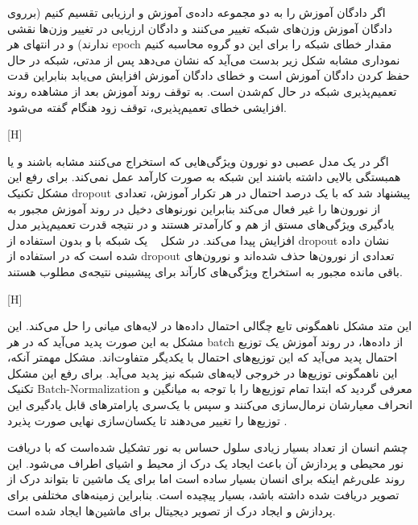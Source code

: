 اگر دادگان آموزش را به دو مجموعه داده‌ی آموزش و ارزیابی تقسیم کنیم (برروی دادگان آموزش وزن‌های شبکه تغییر می‌کنند و دادگان ارزیابی در تغییر وزن‌ها نقشی ندارند) و در انتهای هر epoch مقدار خطای شبکه را برای این دو گروه محاسبه کنیم نموداری مشابه شکل زیر بدست می‌آید که نشان می‌دهد پس از مدتی، شبکه در حال حفظ کردن دادگان آموزش است و خطای دادگان آموزش افزایش می‌یابد بنابراین قدت تعمیم‌پذیری شبکه در حال کم‌شدن است. به توقف روند آموزش بعد از مشاهده روند افزایشی خطای تعمیم‌پذیری، توقف زود هنگام گفته می‌شود.

[H]

اگر در یک مدل عصبی دو نورون ویژگی‌هایی که استخراج می‌کنند مشابه باشند و یا همبستگی بالایی داشته باشند این شبکه به صورت کارآمد عمل نمی‌کند. برای رفع این مشکل تکنیک dropout پیشنهاد شد که با یک درصد احتمال در هر تکرار آموزش، تعدادی از نورون‌ها را غیر فعال می‌کند بنابراین نورنو‌های دخیل در روند آموزش مجبور به یادگیری ویژگی‌های مستق از هم و کارآمدتر هستند و در نتیجه قدرت تعمیم‌پذیر مدل افزایش پیدا می‌کند. در شکل ~ یک شبکه با و بدون استفاده از dropout نشان داده شده است که در استفاده از dropout تعدادی از نورون‌ها حذف شده‌اند و نورون‌های باقی مانده مجبور به استخراج ویژگی‌های کارآند برای پیشبینی نتیجه‌ی مطلوب هستند.

[H]

این متد مشکل ناهمگونی تابع چگالی احتمال داده‌ها در لایه‌های میانی را حل می‌کند. این مشکل به این صورت پدید می‌آید که در هر batch از داده‌ها، در روند آموزش یک توزیع احتمال پدید می‌آید که این توزیع‌های احتمال با یکدیگر متفاوت‌اند. مشکل مهمتر آنکه، این ناهمگونی توزیع‌ها در  خروجی لایه‌های شبکه نیز پدید می‌آید. برای رفع این مشکل تکنیک Batch-Normalization معرفی گردید که ابتدا تمام توزیع‌ها را با توجه به میانگین و انحراف معیارشان نرمال‌سازی می‌کنند و سپس با یک‌سری پارامتر‌های قابل یادگیری این توزیع‌ها را تغییر می‌دهند تا یکسان‌سازی نهایی صورت پذیرد . 

چشم انسان از تعداد بسیار زیادی سلول حساس به نور تشکیل شده‌است که با دریافت نور محیطی و پردازش آن باعث ایجاد یک درک از محیط و اشیای اطراف می‌شود. این روند علی‌رغم اینکه برای انسان بسیار ساده است اما برای یک ماشین تا بتواند درک از تصویر دریافت شده داشته باشد، بسیار پیچیده است. بنابراین زمینه‌های مختلفی برای پردازش و ایجاد درک از تصویر دیجیتال برای ماشین‌ها ایجاد شده است.

